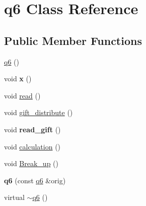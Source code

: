 \hypertarget{classq6}{\section{q6 Class Reference}
\label{classq6}
}
\subsection*{Public Member Functions}
\begin{DoxyCompactItemize}
\item 
\hyperlink{classq6_acb6e21d75a6e5fe5428e3aed8481fda8}{q6} ()
\item 
\hypertarget{classq6_a1dba4c7c4e1bc3535893ba4aba737c86}{void {\bfseries x} ()}\label{classq6_a1dba4c7c4e1bc3535893ba4aba737c86}

\item 
void \hyperlink{classq6_a08cf8991dd2f5e2a9c67539fdfcb9edd}{read} ()
\item 
void \hyperlink{classq6_a155c7bcffe06c46a2a14ad74e2ab266c}{gift\-\_\-distribute} ()
\item 
\hypertarget{classq6_aec4350c500e8a7bf3206ad5835dc4223}{void {\bfseries read\-\_\-gift} ()}\label{classq6_aec4350c500e8a7bf3206ad5835dc4223}

\item 
void \hyperlink{classq6_ae00eb45a41c6074e7084b2612ce118ed}{calculation} ()
\item 
void \hyperlink{classq6_a240f9ed78a0d19b7487b933a4998b69b}{Break\-\_\-up} ()
\item 
\hypertarget{classq6_adeaeb99c1ae07360c2b282665742378e}{{\bfseries q6} (const \hyperlink{classq6}{q6} \&orig)}\label{classq6_adeaeb99c1ae07360c2b282665742378e}

\item 
virtual \hyperlink{classq6_a9ec5fdfefaf4a7e4a24403241a6a40b8}{$\sim$q6} ()
\end{DoxyCompactItemize}
